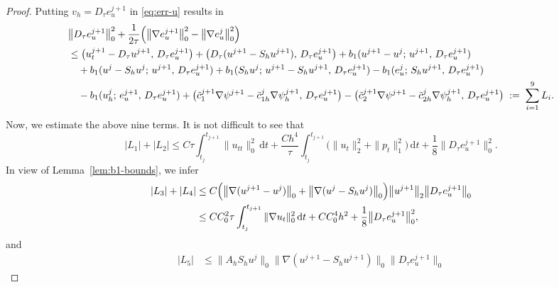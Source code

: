 \begin{proof}
Putting $v_{h} = D_{\tau}e_{u}^{j+1}$ in \eqref{eq:err-u} results in
\begin{align}
  &\bigl\|D_{\tau}e_{u}^{j+1}\bigr\|_{0}^{2}
   + \frac{1}{2\tau}\Bigl(\bigl\|\nabla e_{u}^{j+1}\bigr\|_{0}^{2}
                         - \bigl\|\nabla e_{u}^{j}\bigr\|_{0}^{2}\Bigr)
  \nonumber\\
  &\leq \bigl(u_{t}^{j+1} - D_{\tau}u^{j+1},\, D_{\tau}e_{u}^{j+1}\bigr)
   + \bigl(D_{\tau}(u^{j+1} - S_{h}u^{j+1}),\, D_{\tau}e_{u}^{j+1}\bigr)
   + b_{1}(u^{j+1}-u^{j};\, u^{j+1},\, D_{\tau}e_{u}^{j+1})
  \nonumber\\
  &\quad + b_{1}(u^{j} - S_{h}u^{j};\, u^{j+1},\, D_{\tau}e_{u}^{j+1})
   + b_{1}(S_{h}u^{j};\, u^{j+1} - S_{h}u^{j+1},\, D_{\tau}e_{u}^{j+1})
   - b_{1}(e_{u}^{j};\, S_{h}u^{j+1},\, D_{\tau}e_{u}^{j+1})
  \nonumber\\
  &\quad - b_{1}(u_{h}^{j};\, e_{u}^{j+1},\, D_{\tau}e_{u}^{j+1})
   + \bigl(\tilde{c}_{1}^{j+1}\nabla\psi^{j+1}
             - \tilde{c}_{1h}^{j}\nabla\psi_{h}^{j+1},\, D_{\tau}e_{u}^{j+1}\bigr)
   - \bigl(\tilde{c}_{2}^{j+1}\nabla\psi^{j+1}
             - \tilde{c}_{2h}^{j}\nabla\psi_{h}^{j+1},\, D_{\tau}e_{u}^{j+1}\bigr)
   \;:=\; \sum_{i=1}^{9}L_{i}.
  \label{eq:L-sum}
\end{align}
Now, we estimate the above nine terms. It is not difficult to see that
\begin{equation}\label{eq:L1L2}
  |L_{1}| + |L_{2}|
  \leq C\tau\int_{t_{j}}^{t_{j+1}}\|u_{tt}\|_{0}^{2}\,\mathrm{d}t
     + \frac{Ch^{4}}{\tau}\int_{t_{j}}^{t_{j+1}}
       \bigl(\|u_{t}\|_{2}^{2} + \|p_{t}\|_{1}^{2}\bigr)\,\mathrm{d}t
     + \frac{1}{8}\bigl\|D_{\tau}e_{u}^{j+1}\bigr\|_{0}^{2}.
\end{equation}
In view of Lemma~\ref{lem:b1-bounds}, we infer
\begin{align}
  |L_{3}| + |L_{4}|
  &\leq C\Bigl(\bigl\|\nabla(u^{j+1}-u^{j})\bigr\|_{0}
              + \bigl\|\nabla(u^{j} - S_{h}u^{j})\bigr\|_{0}\Bigr)
    \bigl\|u^{j+1}\bigr\|_{2}\bigl\|D_{\tau}e_{u}^{j+1}\bigr\|_{0}
  \nonumber\\
  &\leq CC_{0}^{2}\tau\int_{t_{j}}^{t_{j+1}}\|\nabla u_{t}\|_{0}^{2}\,\mathrm{d}t
     + CC_{0}^{4}h^{2}
     + \frac{1}{8}\bigl\|D_{\tau}e_{u}^{j+1}\bigr\|_{0}^{2},
  \label{eq:L3L4}
\end{align}
and
\begin{align}
  |L_{5}| &\leq \|A_{h}S_{h}u^{j}\|_{0}
                \bigl\|\nabla(u^{j+1} - S_{h}u^{j+1})\bigr\|_{0}
                \bigl\|D_{\tau}e_{u}^{j+1}\bigr\|_{0}

\end{align}
\end{proof}
